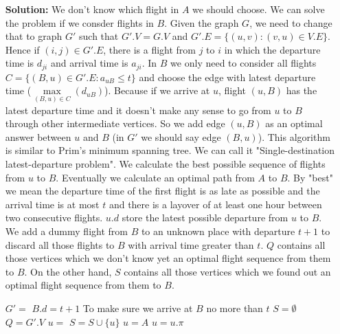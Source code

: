 \documentclass{book}
\begin{document}
\begin{enumerate}
\begin{enumerate}
\begin{itemize}
			\item[\textbf{Solution:}] We don't know which flight in $A$ we should choose. We can solve the problem if we consder flights in $B$. Given the graph $G$, we need to change that to graph $G'$ such that $G'.V = G.V$ and $G'.E = \{(u, v) : (v, u) \in V.E\}$. Hence if $(i, j) \in G'.E$, there is a flight from $j$ to $i$ in which the departure time is $d_{ji}$ and arrival time is $a_{ji}$. In $B$ we only need to consider all flights $C = \{(B, u) \in G'.E : a_{uB} \le t\}$ and choose the edge with latest departure time ($\max\limits_{(B, u) \in C}(d_{uB})$). Because if we arrive at $u$, flight $(u, B)$ has the latest departure time and it doesn't make any sense to go from $u$ to $B$ through other intermediate vertices. So we add edge $(u, B)$ as an optimal answer between $u$ and $B$ (in $G'$ we should say edge $(B, u)$). This algorithm is similar to Prim's minimum spanning tree. We can call it "Single-destination latest-departure problem". We calculate the best possible sequence of flights from $u$ to $B$. Eventually we calculate an optimal path from $A$ to $B$. By "best" we mean the departure time of the first flight is as late as possible and the arrival time is at most $t$ and there is a layover of at least one hour between two consecutive flights. $u.d$ store the latest possible departure from $u$ to $B$. We add a dummy flight from $B$ to an unknown place with departure $t + 1$ to discard all those flights to $B$ with arrival time greater than $t$. $Q$ contains all those vertices which we don't know yet an optimal flight sequence from them to $B$. On the other hand, $S$ contains all those vertices which we found out an optimal flight sequence from them to $B$.
			\begin{algorithm}[h!]
				\begin{algorithmic}[1]			
						\State $G' = $ 
						\State {}
						\State $B.d = t + 1$ \Comment To make sure we arrive at $B$ no more than $t$
						\State $S = \emptyset$
						\State $Q = G'.V$
							\State $u = $ 
							\State $S = S \cup \{u\}$
								\State {}
							\EndFor
						\EndWhile
							\State $u = A$
								\State \Call{PRINT}{$u, u.\pi$}
								\State $u = u.\pi$
							\EndWhile
						\Else
							\State {}
						\EndIf
					\EndFunction

\end{algorithmic}
\end{algorithm}
\end{itemize}
\end{enumerate}
\end{enumerate}
\end{document}
